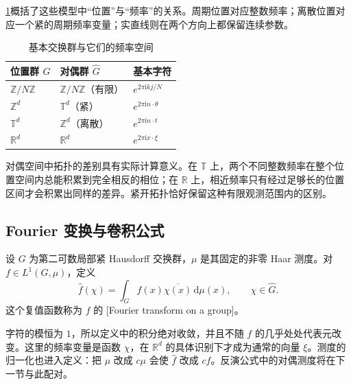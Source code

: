 \cref{b2:tab:I3-frequency-types}概括了这些模型中“位置”与“频率”的关系。周期位置对应整数频率；离散位置对应一个紧的周期频率变量；实直线则在两个方向上都保留连续参数。
\begin{table}[htbp]
\centering
\caption{基本交换群与它们的频率空间}
\label{b2:tab:I3-frequency-types}
\begin{tabular}{lll}
\toprule
位置群 \(G\) & 对偶群 \(\widehat G\) & 基本字符 \\
\midrule
\(\mathbb Z/N\mathbb Z\) & \(\mathbb Z/N\mathbb Z\)（有限） & \(e^{2\pi\mathrm ikj/N}\) \\
\(\mathbb Z^d\) & \(\mathbb T^d\)（紧） & \(e^{2\pi\mathrm in\cdot\theta}\) \\
\(\mathbb T^d\) & \(\mathbb Z^d\)（离散） & \(e^{2\pi\mathrm in\cdot t}\) \\
\(\mathbb R^d\) & \(\mathbb R^d\) & \(e^{2\pi\mathrm ix\cdot\xi}\) \\
\bottomrule
\end{tabular}
\end{table}

对偶空间中拓扑的差别具有实际计算意义。在 \(\mathbb T\) 上，两个不同整数频率在整个位置空间内总能积累到完全相反的相位；在 \(\mathbb R\) 上，相近频率只有经过足够长的位置区间才会积累出同样的差异。紧开拓扑恰好保留这种有限观测范围内的区别。

\subsection{Fourier 变换与卷积公式}
\label{b2:subsec:I20303}

\begin{definition}
\label{b2:def:I3-fourier}
设 \(G\) 为第二可数局部紧 Hausdorff 交换群，\(\mu\) 是其固定的非零 Haar 测度。对 \(f\in L^1(G,\mu)\)，定义
\[
 \widehat f(\chi)=\int_G f(x)\overline{\chi(x)}\,\mathrm d\mu(x),
 \qquad \chi\in\widehat G.
\]
这个复值函数称为 \(f\) 的 [Fourier transform on a group]。
\end{definition}

字符的模恒为 \(1\)，所以定义中的积分绝对收敛，并且不随 \(f\) 的几乎处处代表元改变。这里的频率变量是函数 \(\chi\)，在 \(\mathbb R^d\) 的具体识别下才成为通常的向量 \(\xi\)。测度的归一化也进入定义：把 \(\mu\) 改成 \(c\mu\) 会使 \(\widehat f\) 改成 \(c\widehat f\)。反演公式中的对偶测度将在下一节与此配对。

